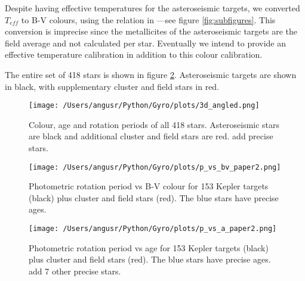 \documentclass[10pt,preprint]{aastex}
\begin{document}
Despite having effective temperatures for the asteroseismic targets, we converted $T_{eff}$ to B-V colours, using the relation in \citet{Sekiguchi2000}---see figure \ref{fig:subfigures}.
This conversion is imprecise since the metallicites of the asteroseismic targets are the field average and not calculated per star.
Eventually we intend to provide an effective temperature calibration in addition to this colour calibration.

The entire set of 418 stars is shown in figure \ref{fig:3d}. Asteroseismic targets are shown in black, with supplementary cluster and field stars in red.

\begin{figure}[ht]
\begin{center}
\texttt{[image: /Users/angusr/Python/Gyro/plots/3d\_angled.png]}
\caption{Colour, age and rotation periods of all 418 stars. Asteroseismic stars are black and additional cluster and field stars are red. {\color{red}add precise stars.}}
\label{fig:3d}
\end{center}
\end{figure}

\begin{figure}[ht]
\begin{center}
\texttt{[image: /Users/angusr/Python/Gyro/plots/p\_vs\_bv\_paper2.png]}
\caption{Photometric rotation period vs B-V colour for 153 Kepler targets (black) plus cluster and field stars (red). The blue stars have precise ages.}
\label{fig:3d}
\end{center}
\end{figure}

\begin{figure}[ht]
\begin{center}
\texttt{[image: /Users/angusr/Python/Gyro/plots/p\_vs\_a\_paper2.png]}
\caption{Photometric rotation period vs age for 153 Kepler targets (black) plus cluster and field stars (red). The blue stars have precise ages. {\color{red} add 7 other precise stars.}}
\label{fig:p_vs_a}
\end{center}
\end{figure}



\end{document}
